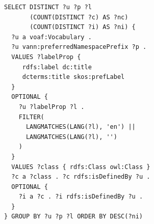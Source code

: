 \begin{lstlisting}[captionpos=b, caption=Q1 -- Query to get a list of ontologies with number of classes and number of class instances,label=lst:sparql1,basicstyle=\ttfamily,frame=single]
SELECT DISTINCT ?u ?p ?l 
       (COUNT(DISTINCT ?c) AS ?nc) 
       (COUNT(DISTINCT ?i) AS ?ni) {
  ?u a voaf:Vocabulary .
  ?u vann:preferredNamespacePrefix ?p .
  VALUES ?labelProp { 
     rdfs:label dc:title
     dcterms:title skos:prefLabel
  }
  OPTIONAL {
    ?u ?labelProp ?l .
    FILTER(
      LANGMATCHES(LANG(?l), 'en') || 
      LANGMATCHES(LANG(?l), '')
    )
  }
  VALUES ?class { rdfs:Class owl:Class }
  ?c a ?class . ?c rdfs:isDefinedBy ?u .
  OPTIONAL {
    ?i a ?c . ?i rdfs:isDefinedBy ?u .
  }
} GROUP BY ?u ?p ?l ORDER BY DESC(?ni)
\end{lstlisting}

